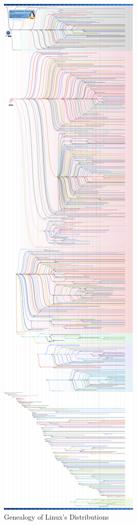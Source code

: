 \documentclass[
12pt,				%
openright,			%
oneside,			%
a4paper,			%
brazil,				%
english,			%
]{abntex2}
\begin{document}
\begin{figure}[!htb]
  \caption{\label{fig:linux-genealogy} Genealogy of Linux's Distributions}
  \includegraphics[height=\textwidth, angle=-90]{diversidade}
\end{figure}


\end{document}
